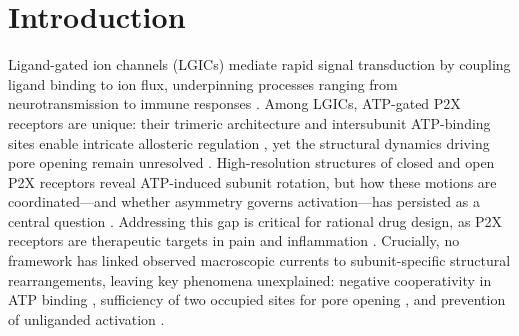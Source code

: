 \documentclass[pdflatex,sn-mathphys-num]{sn-jnl}%
\theoremstyle{thmstyleone}%
\theoremstyle{thmstyletwo}%
\theoremstyle{thmstylethree}%
\begin{document}
\section{Introduction}

Ligand-gated ion channels (LGICs) mediate rapid signal transduction by coupling ligand binding to ion flux, underpinning processes ranging from neurotransmission to immune responses \cite{UNWIN199331, Hodo2020CriticalNI, Savio2018ThePR, Stebbing2015TheRO}. Among LGICs, ATP-gated P2X receptors are unique: their trimeric architecture \cite{Nicke1998P2X1AP} and intersubunit ATP-binding sites \cite{MarquezKlaka2007IdentificationOA,cerrada_p2x, abierta_p2x} enable intricate allosteric regulation \cite{Sattler2020UnravellingTI}, yet the structural dynamics driving pore opening remain unresolved \cite{Hattori2012MolecularMO}. High-resolution structures of closed \cite{cerrada_p2x} and open \cite{abierta_p2x} P2X receptors reveal ATP-induced subunit rotation, but how these motions are coordinated—and whether asymmetry governs activation—has persisted as a central question \cite{Hattori2012MolecularMO, piedominici_p2x_1}. Addressing this gap is critical for rational drug design, as P2X receptors are therapeutic targets in pain and inflammation \cite{North2013P2XRA}. Crucially, no framework has linked observed macroscopic currents to subunit-specific structural rearrangements, leaving key phenomena unexplained: negative cooperativity in ATP binding \cite{Sattler2020UnravellingTI}, sufficiency of two occupied sites for pore opening \cite{Stelmashenko2012ActivationOT}, and prevention of unliganded activation . 

\end{document}
